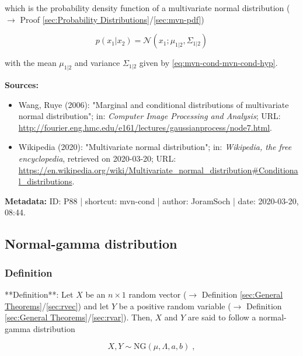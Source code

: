 \documentclass[a4paper,12pt,twoside]{book}
\begin{document}
which is the probability density function of a multivariate normal distribution ($\rightarrow$ Proof \ref{sec:Probability Distributions}/\ref{sec:mvn-pdf})

\begin{equation} \label{eq:mvn-cond-mvn-cond-s10}
p(x_1|x_2) = \mathcal{N}(x_1; \mu_{1|2}, \Sigma_{1|2})
\end{equation}

with the mean $\mu_{1 \vert 2}$ and variance $\Sigma_{1 \vert 2}$ given by \eqref{eq:mvn-cond-mvn-cond-hyp}.


\vspace{1em}
\textbf{Sources:}
\begin{itemize}
\item Wang, Ruye (2006): "Marginal and conditional distributions of multivariate normal distribution"; in: \textit{Computer Image Processing and Analysis}; URL: \url{http://fourier.eng.hmc.edu/e161/lectures/gaussianprocess/node7.html}.
\item Wikipedia (2020): "Multivariate normal distribution"; in: \textit{Wikipedia, the free encyclopedia}, retrieved on 2020-03-20; URL: \url{https://en.wikipedia.org/wiki/Multivariate_normal_distribution#Conditional_distributions}.
\end{itemize}


\vspace{1em}
\textbf{Metadata:} ID: P88 | shortcut: mvn-cond | author: JoramSoch | date: 2020-03-20, 08:44.
\vspace{1em}



\subsection{Normal-gamma distribution}

\subsubsection[\textit{Definition}]{Definition} \label{sec:ng}
\setcounter{equation}{0}

**Definition**: Let $X$ be an $n \times 1$ random vector ($\rightarrow$ Definition \ref{sec:General Theorems}/\ref{sec:rvec}) and let $Y$ be a positive random variable ($\rightarrow$ Definition \ref{sec:General Theorems}/\ref{sec:rvar}). Then, $X$ and $Y$ are said to follow a normal-gamma distribution

\begin{equation} \label{eq:ng-ng}
X,Y \sim \mathrm{NG}(\mu, \Lambda, a, b) \; ,
\end{equation}
\end{document}
